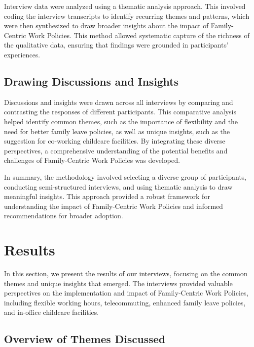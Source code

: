 \documentclass{article} %
\begin{document}
Interview data were analyzed using a thematic analysis approach. This involved coding the interview transcripts to identify recurring themes and patterns, which were then synthesized to draw broader insights about the impact of Family-Centric Work Policies. This method allowed systematic capture of the richness of the qualitative data, ensuring that findings were grounded in participants' experiences.

\subsection{Drawing Discussions and Insights}

Discussions and insights were drawn across all interviews by comparing and contrasting the responses of different participants. This comparative analysis helped identify common themes, such as the importance of flexibility and the need for better family leave policies, as well as unique insights, such as the suggestion for co-working childcare facilities. By integrating these diverse perspectives, a comprehensive understanding of the potential benefits and challenges of Family-Centric Work Policies was developed.

In summary, the methodology involved selecting a diverse group of participants, conducting semi-structured interviews, and using thematic analysis to draw meaningful insights. This approach provided a robust framework for understanding the impact of Family-Centric Work Policies and informed recommendations for broader adoption.


\section{Results}
\label{sec:results}

In this section, we present the results of our interviews, focusing on the common themes and unique insights that emerged. The interviews provided valuable perspectives on the implementation and impact of Family-Centric Work Policies, including flexible working hours, telecommuting, enhanced family leave policies, and in-office childcare facilities.

\subsection{Overview of Themes Discussed}
\end{document}
